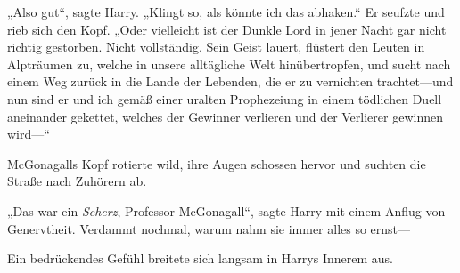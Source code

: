 „Also gut“, sagte Harry. „Klingt so, als könnte ich das abhaken.“ Er seufzte und rieb sich den Kopf. „Oder vielleicht ist der Dunkle Lord in jener Nacht gar nicht richtig gestorben. Nicht vollständig. Sein Geist lauert, flüstert den Leuten in Alpträumen zu, welche in unsere alltägliche Welt hinübertropfen, und sucht nach einem Weg zurück in die Lande der Lebenden, die er zu vernichten trachtet—und nun sind er und ich gemäß einer uralten Prophezeiung in einem tödlichen Duell aneinander gekettet, welches der Gewinner verlieren und der Verlierer gewinnen wird—“

McGonagalls Kopf rotierte wild, ihre Augen schossen hervor und suchten die Straße nach Zuhörern ab.

„Das war ein \emph{Scherz}, Professor McGonagall“, sagte Harry mit einem Anflug von Genervtheit. Verdammt nochmal, warum nahm sie immer alles so ernst—

Ein bedrückendes Gefühl breitete sich langsam in Harrys Innerem aus.

